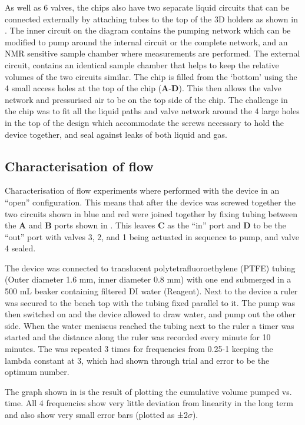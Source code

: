 As well as 6 valves, the chips also have two separate liquid
circuits that can be connected externally by attaching tubes to the top of the 3D
holders as shown in . The inner circuit on
the diagram contains the pumping network which can be
modified to pump around the internal circuit or the complete network, and an NMR
sensitive sample chamber where measurements are performed. The external circuit,
contains an identical sample chamber that helps to keep the relative
volumes of the two circuits similar. The chip is filled from the
‘bottom’ using the 4 small access holes at the top of the chip (\textbf{A}-\textbf{D}).
This then allows the valve network and pressurised air to be
on the top side of the chip. The challenge in the chip was to fit
all the liquid paths and valve network around the 4 large
holes in the top of the design which accommodate the screws
necessary to hold the device together, and seal against leaks of
both liquid and gas.


\subsection{Characterisation of flow}

Characterisation of flow experiments where performed with the device in an “open”
configuration. This means that after the device was screwed together the two circuits shown
in blue and red were joined together by fixing tubing between the \textbf{A} and \textbf{B} ports shown in
. This leaves \textbf{C} as the “in” port and \textbf{D} to be the “out” port with valves 3, 2, and 1
being actuated in sequence to pump, and valve 4 sealed.

The device was connected to translucent polytetrafluoroethylene (PTFE) tubing (Outer
diameter 1.6 mm, inner diameter 0.8 mm) with one end submerged in a 500 mL beaker
containing filtered DI water (Reagent). Next to the device a ruler was secured to the bench
top with the tubing fixed parallel to it. The pump was then switched on and the device
allowed to draw water, and pump out the other side. When the water meniscus reached the tubing
next to the ruler a timer was started and the distance along the ruler was recorded every
minute for 10 minutes. The was repeated 3 times for frequencies from 0.25-1 keeping the
lambda constant at 3, which had shown through trial and error to be the optimum number.

The graph shown in  is the result of plotting the cumulative volume pumped
vs. time. All 4 frequencies show very little deviation from linearity in the
long term and also show very small error bars (plotted as ±2$\sigma$).

